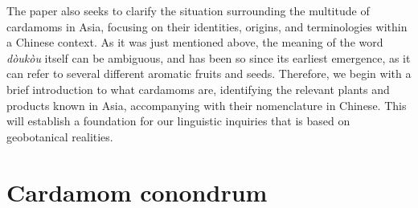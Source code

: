 \documentclass[12pt]{article}
\newcommand{\tc}[1]{\traditionalchinesefont{#1}\rmfamily}
\begin{document}




The paper also seeks to clarify the situation surrounding the multitude of cardamoms in Asia, focusing on their identities, origins, and terminologies within a Chinese context. As it was just mentioned above, the meaning of the word \textit{dòukòu} itself can be ambiguous, and has been so since its earliest emergence, as it can refer to several different aromatic fruits and seeds. Therefore, we begin with a brief introduction to what cardamoms are, identifying the relevant plants and products known in Asia, accompanying with their nomenclature in Chinese. This will establish a foundation for our linguistic inquiries that is based on geobotanical realities.

\section{Cardamom conondrum}\label{sec:one}
\end{document}
